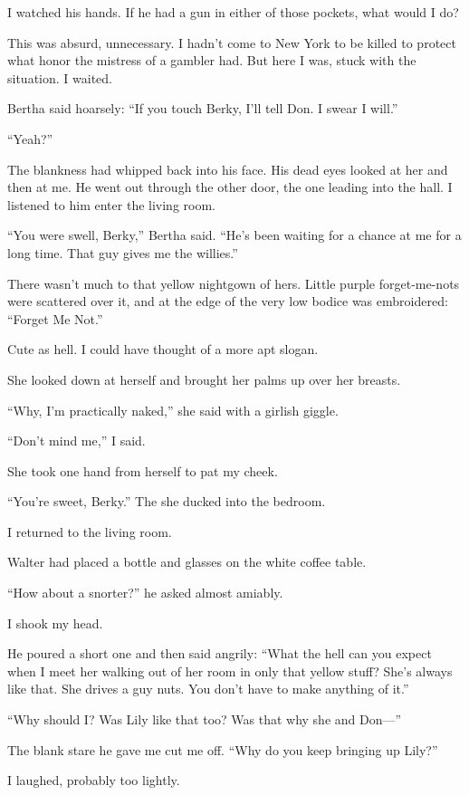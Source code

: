 \documentclass{novel}
\begin{document}
I watched his hands. If he had a gun in either of those pockets, what would I do? 

This was absurd, unnecessary. I hadn’t come to New York to be killed to protect what honor the mistress of a gambler had. But here I was, stuck with the situation. I waited.

Bertha said hoarsely: “If you touch Berky, I’ll tell Don. I swear I will.”

“Yeah?” 

The blankness had whipped back into his face. His dead eyes looked at her and then at me. He went out through the other door, the one leading into the hall. I listened to him enter the living room.

“You were swell, Berky,” Bertha said. “He’s been waiting for a chance at me for a long time. That guy gives me the willies.”

There wasn’t much to that yellow nightgown of hers. Little purple forget-me-nots were scattered over it, and at the edge of the very low bodice was embroidered: “Forget Me Not.”

Cute as hell. I could have thought of a more apt slogan.

She looked down at herself and brought her palms up over her breasts. 

“Why, I’m practically naked,” she said with a girlish giggle.

“Don’t mind me,” I said.

She took one hand from herself to pat my cheek. 

“You’re sweet, Berky.” The she ducked into the bedroom.

\scenestars

I returned to the living room.

Walter had placed a bottle and glasses on the white coffee table. 

“How about a snorter?” he asked almost amiably.

I shook my head.

He poured a short one and then said angrily: “What the hell can you expect when I meet her walking out of her room in only that yellow stuff? She’s always like that. She drives a guy nuts. You don’t have to make anything of it.”

“Why should I? Was Lily like that too? Was that why she and Don—”

The blank stare he gave me cut me off. “Why do you keep bringing up Lily?”

I laughed, probably too lightly. 
\end{document}
